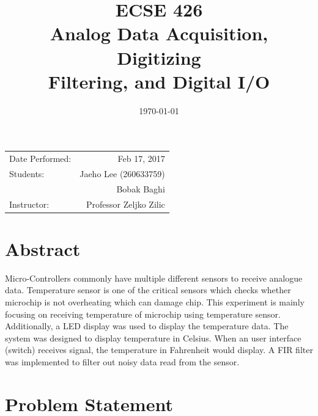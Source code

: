 \documentclass{article}
\title{ECSE 426 \\ Analog Data Acquisition, Digitizing\\ Filtering, and Digital I/O} %
\begin{document}
\maketitle %

\begin{center}
\begin{tabular}{l r}
Date Performed: & Feb 17, 2017 \\ %
Students: & Jaeho Lee (260633759) \\ %
& Bobak Baghi \\
Instructor: & Professor Zeljko Zilic %
\end{tabular}
\end{center}

\date{\today} %



\section{Abstract}

Micro-Controllers commonly have multiple different sensors to receive analogue data. Temperature sensor is one of the critical sensors which checks whether microchip is not overheating which can damage chip. This experiment is mainly focusing on receiving temperature of microchip using temperature sensor. Additionally, a LED display was used to display the temperature data. The system was designed to display temperature in Celsius.  When an user interface (switch) receives signal, the temperature in Fahrenheit would display. A FIR filter was implemented to filter out noisy data read from the sensor.


\section{Problem Statement}
\end{document}
